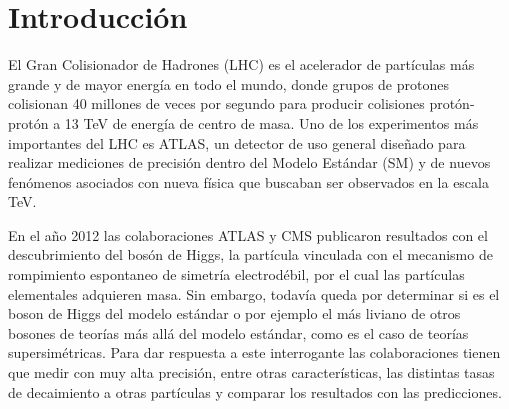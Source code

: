 \chapter*{Introducción}

El Gran Colisionador de Hadrones (LHC) es el acelerador de partículas más grande y de mayor energía en todo el mundo, donde grupos de protones colisionan 40 millones de veces por segundo para producir colisiones protón-protón a 13 TeV de energía de centro de masa. Uno de los experimentos más importantes del LHC es ATLAS, un detector de uso general diseñado para realizar mediciones de precisión dentro del Modelo Estándar (SM) y de nuevos fenómenos asociados con nueva física que buscaban ser observados en la escala TeV. 

En el año 2012 las colaboraciones ATLAS y CMS publicaron resultados con el descubrimiento del bosón de Higgs, la partícula vinculada con el mecanismo de rompimiento espontaneo de simetría electrodébil, por el cual las partículas elementales adquieren masa. Sin embargo, todavía queda por determinar si es el boson de Higgs del modelo estándar o por ejemplo el más liviano de otros bosones de teorías más allá del modelo estándar, como es el caso de teorías supersimétricas. Para dar respuesta a este interrogante las colaboraciones tienen que medir con muy alta precisión, entre otras características, las distintas tasas de decaimiento a otras partículas y comparar los resultados con las predicciones.

